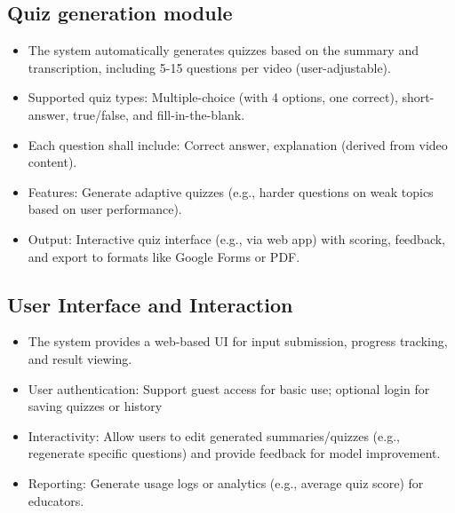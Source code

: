 \subsection{Quiz generation module}
\begin{itemize}
    \item The system automatically generates quizzes based on the summary and transcription, including 5-15 questions per video (user-adjustable).
    \item Supported quiz types: Multiple-choice (with 4 options, one correct), short-answer, true/false, and fill-in-the-blank. 
    \item Each question shall include: Correct answer, explanation (derived from video content).
    \item Features: Generate adaptive quizzes (e.g., harder questions on weak topics based on user performance).
    \item Output: Interactive quiz interface (e.g., via web app) with scoring, feedback, and export to formats like Google Forms or PDF.
\end{itemize}

\subsection{User Interface and Interaction}
\begin{itemize}
    \item The system provides a web-based UI for input submission, progress tracking,  and result viewing. 
    \item User authentication: Support guest access for basic use; optional login for saving quizzes or history
    \item Interactivity: Allow users to edit generated summaries/quizzes (e.g., regenerate specific questions) and provide feedback for model improvement.
    \item Reporting: Generate usage logs or analytics (e.g., average quiz score) for educators.
\end{itemize}